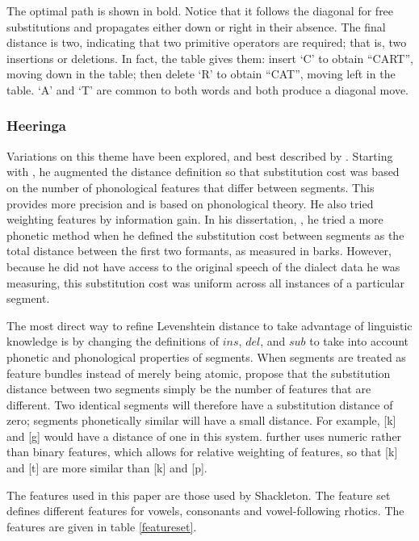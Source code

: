 \documentclass[11pt]{article}
\begin{document}
The optimal path is shown in bold. Notice that it
follows the diagonal for free substitutions and propagates either down or right
in their absence. The final distance is two, indicating that two
primitive operators are required; that is, two insertions or deletions.
In fact, the table gives
them: insert `C' to obtain ``CART'', moving down in the table; then
delete `R' to obtain ``CAT'', moving left in the table. `A' and `T'
are common to both words and both produce a diagonal move.

\subsubsection{Heeringa}
\label{levmethod}
Variations on this theme have been explored, and best described by
. Starting with \cite{nerbonne97}, he augmented
the distance definition so that substitution cost was based on the
number of phonological features that differ between segments. This provides more
precision and is based on phonological theory. He also tried
weighting features by information gain.  In his dissertation,
\cite{heeringa04}, he tried a more phonetic method when he defined the
substitution cost between segments as the total distance between the
first two formants, as measured in barks. However, because he did not
have access to the original speech of the dialect data he was
measuring, this substitution cost was uniform across all instances of
a particular segment.

The most direct way to refine Levenshtein distance to take advantage
of linguistic knowledge is by changing the definitions of $ins$,
$del$, and $sub$ to take into account phonetic and phonological
properties of segments. When segments are treated as feature bundles
instead of merely being atomic,  propose that the
substitution distance between two segments simply be the number of
features that are different. Two identical segments will therefore
have a substitution distance of zero; segments phonetically similar
will have a small distance. For example, [k] and [g] would have a
distance of one in this system.  further uses
numeric rather than binary features, which allows for relative
weighting of features, so that [k] and [t] are more similar than [k]
and [p].

The features used in this paper are those used by Shackleton. The
feature set defines different features for vowels, consonants and
vowel-following rhotics. The features are given in table
\ref{featureset}.
\end{document}
